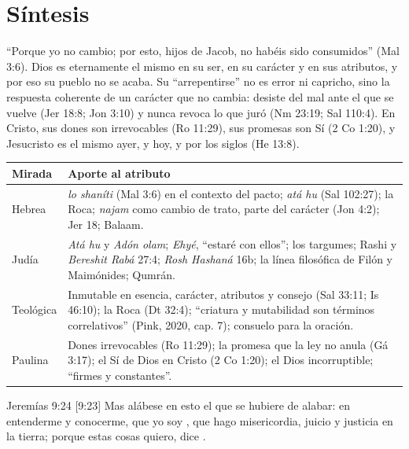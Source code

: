 \section{Síntesis}

``Porque yo \SENOR{} no cambio; por esto, hijos de Jacob, no habéis sido consumidos'' (Mal 3:6). Dios es eternamente el mismo en su ser, en su carácter y en sus atributos, y por eso su pueblo no se acaba. Su ``arrepentirse'' no es error ni capricho, sino la respuesta coherente de un carácter que no cambia: desiste del mal ante el que se vuelve (Jer 18:8; Jon 3:10) y nunca revoca lo que juró (Nm 23:19; Sal 110:4). En Cristo, sus dones son irrevocables (Ro 11:29), sus promesas son Sí (2 Co 1:20), y Jesucristo es el mismo ayer, y hoy, y por los siglos (He 13:8).

\begin{center}\small\renewcommand{\arraystretch}{1.18}
\begin{tabular}{@{}L{2.4cm}L{11.4cm}@{}}
\toprule
\textbf{Mirada} & \textbf{Aporte al atributo} \\ \midrule
Hebrea & \emph{lo shaníti} (Mal 3:6) en el contexto del pacto; \emph{atá hu} (Sal 102:27); la Roca; \emph{najam} como cambio de trato, parte del carácter (Jon 4:2); Jer 18; Balaam. \\
Judía & \emph{Atá hu} y \emph{Adón olam}; \emph{Ehyé}, ``estaré con ellos''; los targumes; Rashi y \emph{Bereshit Rabá} 27:4; \emph{Rosh Hashaná} 16b; la línea filosófica de Filón y Maimónides; Qumrán. \\
Teológica & Inmutable en esencia, carácter, atributos y consejo (Sal 33:11; Is 46:10); la Roca (Dt 32:4); ``criatura y mutabilidad son términos correlativos'' (Pink, 2020, cap. 7); consuelo para la oración. \\
Paulina & Dones irrevocables (Ro 11:29); la promesa que la ley no anula (Gá 3:17); el Sí de Dios en Cristo (2 Co 1:20); el Dios incorruptible; ``firmes y constantes''. \\
\bottomrule
\end{tabular}\end{center}

\begin{verso}{Jeremías 9:24 [9:23]}
Mas alábese en esto el que se hubiere de alabar: en entenderme y conocerme, que yo soy \SENOR, que hago misericordia, juicio y justicia en la tierra; porque estas cosas quiero, dice \SENOR.
\end{verso}

